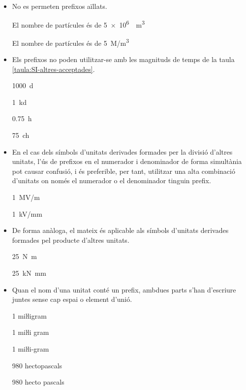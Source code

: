 \begin{itemize}
\textcolor{Red}\faTimesCircle{} \qty{3e-6}{kg} = \qty{3}{\micro kg}


\item No es permeten prefixos aïllats.

\textcolor{Green}\faCheckSquare{} El nombre de partícules és de \qty[per-mode = symbol]{5e6}{\per\cubic\metre}

\textcolor{Red}\faTimesCircle{} El nombre de partícules és de \qty{5}{M/m^3}


\item Els prefixos no poden utilitzar-se amb les magnituds  de temps de la taula \vref{taula:SI-altres-acceptades}.

\textcolor{Green}\faCheckSquare{} \qty{1000}{d}

\textcolor{Red}\faTimesCircle{}  \qty{1}{kd}

\textcolor{Green}\faCheckSquare{} \qty{0,75}{h}

\textcolor{Red}\faTimesCircle{}  \qty{75}{ch}


\item En el cas dels símbols d'unitats derivades formades per la divisió
d'altres unitats, l'ús de prefixos en el numerador i denominador de
forma simultània pot causar confusió, i és preferible, per tant,
utilitzar una alta combinació d'unitats on només el numerador o el
denominador tinguin prefix.

\textcolor{Green}\faCheckSquare{} \qty{1}{MV/m}

\textcolor{Blue}\faExclamationTriangle{}  \qty{1}{kV/mm}


\item De forma anàloga, el mateix és aplicable als símbols d'unitats
derivades formades pel producte d'altres unitats.

\textcolor{Green}\faCheckSquare{} \qty{25}{N.m}

\textcolor{Blue}\faExclamationTriangle{}  \qty{25}{kN.mm}


 \item Quan el nom d'una unitat
conté un prefix, ambdues parts s'han d'escriure juntes sense cap espai o element d'unió.

\textcolor{Green}\faCheckSquare{} 1 miŀligram

\textcolor{Red}\faTimesCircle{} 1 miŀli gram

\textcolor{Red}\faTimesCircle{} 1 miŀli-gram

\textcolor{Green}\faCheckSquare{}  980 hectopascals

\textcolor{Red}\faTimesCircle{} 980 hecto pascals


\end{itemize}
